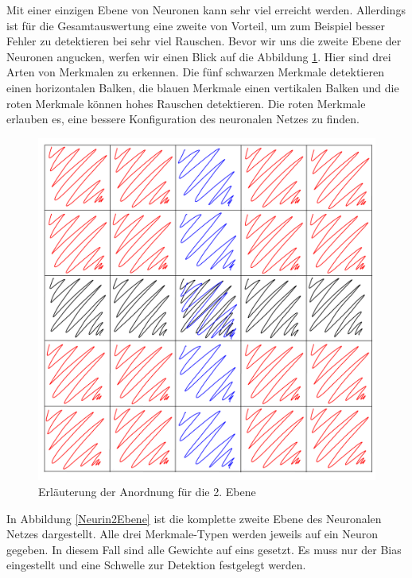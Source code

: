 Mit einer einzigen Ebene von Neuronen kann sehr viel erreicht werden. Allerdings ist für die Gesamtauswertung eine zweite von Vorteil, um zum Beispiel besser Fehler zu detektieren bei sehr viel Rauschen. Bevor wir uns die zweite Ebene der Neuronen angucken, werfen wir einen Blick auf die Abbildung \ref{Erl2Ebene}. Hier sind drei Arten von Merkmalen zu erkennen. Die fünf schwarzen Merkmale detektieren einen horizontalen Balken, die blauen Merkmale einen vertikalen Balken und die roten Merkmale können hohes Rauschen detektieren. Die roten Merkmale erlauben es, eine bessere Konfiguration des neuronalen Netzes zu finden.

\begin{figure}[hbt]
	\centering
	\includegraphics[width=0.6\linewidth]{./Bilder/Auswertung/Aufbau/page6}
	\caption{Erläuterung der Anordnung für die 2. Ebene}
	\label{Erl2Ebene}
\end{figure}

In Abbildung \ref{Neurin2Ebene} ist die komplette zweite Ebene des Neuronalen Netzes dargestellt. Alle drei Merkmale-Typen werden jeweils auf ein Neuron gegeben. In diesem Fall sind alle Gewichte auf eins gesetzt. Es muss nur der Bias eingestellt und eine Schwelle zur Detektion festgelegt werden. 

